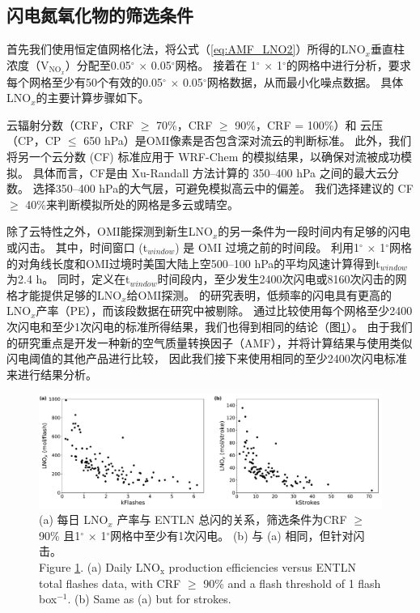 \subsection{闪电氮氧化物的筛选条件}

首先我们使用恒定值网格化法，将公式（\ref{eq:AMF_LNO2}）所得的LNO$_x$垂直柱浓度（V$_{\textrm{NO$_x$}}$）分配至0.05$^{\circ}$ $\times$ 0.05$^{\circ}$网格\citep{Kuhlmann.2014}。
接着在 1$^{\circ}$ $\times$ 1$^{\circ}$的网格中进行分析，要求每个网格至少有50个有效的0.05$^{\circ}$ $\times$ 0.05$^{\circ}$网格数据，从而最小化噪点数据。
具体LNO$_x$的主要计算步骤如下。

云辐射分数（CRF，CRF $\geq$ 70\%，CRF $\geq$ 90\%，CRF = 100\%）和 云压（CP，CP $\leq$ 650 hPa）是OMI像素是否包含深对流云的判断标准\citep{Ziemke.2009,Choi.2014,Pickering.2016}。
此外，我们将另一个云分数 (CF) 标准应用于 WRF-Chem 的模拟结果，以确保对流被成功模拟。
具体而言，CF是由 Xu-Randall 方法计算的 350--400 hPa 之间的最大云分数\citep{Xu.1996,Strode.2017}。
选择350--400 hPa的大气层，可避免模拟高云中的偏差。
我们选择\citet{Strode.2017}建议的 CF $\geq$ 40\%来判断模拟所处的网格是多云或晴空。

除了云特性之外，OMI能探测到新生LNO$_x$的另一条件为一段时间内有足够的闪电或闪击。
其中，时间窗口 (t$_{window}$) 是 OMI 过境之前的时间段。
\citet{Lapierre.2020}利用1$^{\circ}$ $\times$ 1$^{\circ}$网格的对角线长度和OMI过境时美国大陆上空500--100 hPa的平均风速计算得到t$_{window}$为2.4 h。
同时，\citet{Lapierre.2020}定义在t$_{window}$时间段内，至少发生2400次闪电或8160次闪击的网格才能提供足够的LNO$_x$给OMI探测。
\citet{Bucsela.2019}的研究表明，低频率的闪电具有更高的LNO$_x$产率（PE），而该段数据在\citet{Lapierre.2020}研究中被剔除。
通过比较使用每个网格至少2400次闪电和至少1次闪电的标准所得结果，我们也得到相同的结论（图\ref{fig:us_flash_threshold}）。
由于我们的研究重点是开发一种新的空气质量转换因子（AMF），并将计算结果与使用类似闪电阈值的其他产品进行比较\citep{Pickering.2016,Lapierre.2020}，
因此我们接下来使用相同的至少2400次闪电标准来进行结果分析。


\begin{figure}[!htbp]
    \includegraphics[width=15cm]{./figures/us_flash_threshold.pdf}
    \caption{
    (a) 每日 LNO$_x$ 产率与 ENTLN 总闪的关系，筛选条件为CRF $\geq$ 90\% 且1$^{\circ}$ $\times$ 1$^{\circ}$网格中至少有1次闪电。
     (b) 与 (a) 相同，但针对闪击。\\
    Figure \ref{fig:us_flash_threshold}. (a) Daily LNO$_\textrm{x}$ production efficiencies versus ENTLN total flashes data, with CRF $\geq$ 90\% and a flash threshold of 1 flash box$^{-1}$.
    (b) Same as (a) but for strokes.}
    \label{fig:us_flash_threshold}
\end{figure}


